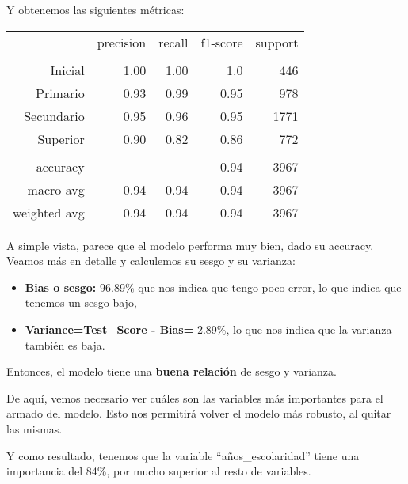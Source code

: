 \documentclass[a4paper]{article}
\begin{document}
            Y obtenemos las siguientes métricas:

            \begin{table}[H]
                \centering
                \begin{tabular}{rrrrr}
                    ~ & precision & recall & f1-score & support \\ 
                    & & & & \\
                    Inicial    & 1.00& 1.00 & 1.0 & 446 \\ 
                    Primario   & 0.93 & 0.99 & 0.95 & 978 \\ 
                    Secundario & 0.95 & 0.96 & 0.95 & 1771 \\ 
                    Superior   & 0.90 & 0.82 & 0.86 & 772 \\ 
                    & & & & \\
                    accuracy & & & 0.94 & 3967 \\ 
                    macro avg & 0.94 & 0.94 & 0.94 & 3967 \\ 
                    weighted avg & 0.94 & 0.94 & 0.94 & 3967 \\ 
                \end{tabular}
            \end{table}

            A simple vista, parece que el modelo performa muy bien, dado su accuracy. Veamos más en detalle y calculemos su sesgo y su varianza:
            \begin{itemize}
                \item \textbf{Bias o sesgo:} 96.89\% que nos indica que tengo poco error, lo que indica que tenemos un sesgo bajo,
                \item \textbf{Variance=Test\_Score - Bias=} 2.89\%, lo que nos indica que la varianza también es baja.
            \end{itemize}

            Entonces, el modelo tiene una \textbf{buena relación} de sesgo y varianza.

            De aquí, vemos necesario ver cuáles son las variables más importantes para el armado del modelo. Esto nos permitirá volver el modelo más robusto, al quitar las mismas. 

            Y como resultado, tenemos que la variable ``años\_escolaridad'' tiene una importancia del 84\%, por mucho superior al resto de variables.

\end{document}
